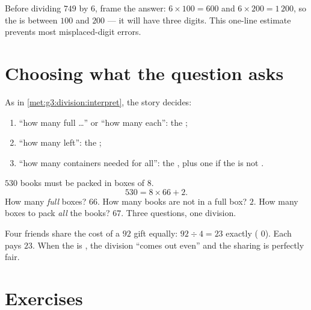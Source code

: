 \begin{example}\label{ex:g4:division:size}
Before dividing $749$ by $6$, frame the answer:
$6 \times 100 = 600$ and $6 \times 200 = 1\,200$, so the  is
between $100$ and $200$ --- it will have three digits. This one-line
estimate prevents most misplaced-digit errors.
\end{example}

\section{Choosing what the question asks}

\begin{method}\label{met:g4:division:interpret}
As in \cref{met:g3:division:interpret}, the story decides:
\begin{enumerate}
  \item ``how many full \dots'' or ``how many each'': the ;
  \item ``how many left'': the ;
  \item ``how many containers needed for all'': the , plus
        one if the  is not .
\end{enumerate}
\end{method}

\begin{example}\label{ex:g4:division:problem}
$530$ books must be packed in boxes of $8$.
\[
530 = 8 \times 66 + 2 .
\]
How many \emph{full} boxes? $66$. How many books are not in a full
box? $2$. How many boxes to pack \emph{all} the books? $67$.
Three questions, one division.
\end{example}

\begin{example}\label{ex:g4:division:money}
Four friends share the cost of a $92$ gift equally:
$92 \div 4 = 23$ exactly ( $0$). Each pays $23$. When the
 is , the division ``comes out even'' and the sharing
is perfectly fair.
\end{example}

\section{Exercises}

